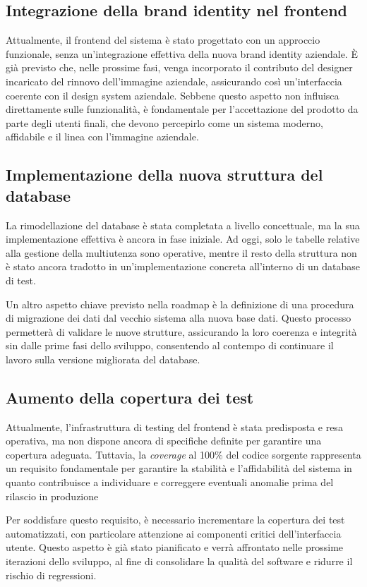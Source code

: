 \subsection{Integrazione della brand identity nel frontend}
Attualmente, il frontend del sistema è stato progettato con un approccio funzionale, senza un’integrazione effettiva della nuova brand identity aziendale. È già previsto che, nelle prossime fasi, venga incorporato il contributo del designer incaricato del rinnovo dell’immagine aziendale, assicurando così un'interfaccia coerente con il design system aziendale. Sebbene questo aspetto non influisca direttamente sulle funzionalità, è fondamentale per l’accettazione del prodotto da parte degli utenti finali, che devono percepirlo come un sistema moderno, affidabile e il linea con l’immagine aziendale.

\subsection{Implementazione della nuova struttura del database}
La rimodellazione del database è stata completata a livello concettuale, ma la sua implementazione effettiva è ancora in fase iniziale. Ad oggi, solo le tabelle relative alla gestione della multiutenza sono operative, mentre il resto della struttura non è stato ancora tradotto in un’implementazione concreta all’interno di un database di test.

Un altro aspetto chiave previsto nella roadmap è la definizione di una procedura di migrazione dei dati dal vecchio sistema alla nuova base dati. Questo processo permetterà di validare le nuove strutture, assicurando la loro coerenza e integrità sin dalle prime fasi dello sviluppo, consentendo al contempo di continuare il lavoro sulla versione migliorata del database.

\subsection{Aumento della copertura dei test}
Attualmente, l’infrastruttura di testing del frontend è stata predisposta e resa operativa, ma non dispone ancora di specifiche definite per garantire una copertura adeguata. Tuttavia, la \textit{coverage} al 100\% del codice sorgente rappresenta un requisito fondamentale per garantire la stabilità e l’affidabilità del sistema in quanto contribuisce a individuare e correggere eventuali anomalie prima del rilascio in produzione

Per soddisfare questo requisito, è necessario incrementare la copertura dei test automatizzati, con particolare attenzione ai componenti critici dell’interfaccia utente. Questo aspetto è già stato pianificato e verrà affrontato nelle prossime iterazioni dello sviluppo, al fine di consolidare la qualità del software e ridurre il rischio di regressioni.

